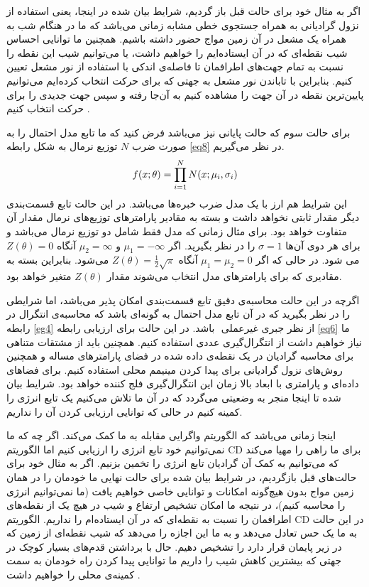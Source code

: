 اگر به مثال خود برای حالت قبل باز گردیم، شرایط بیان شده در اینجا، یعنی‌ استفاده از نزول گرادیانی به همراه جستجوی خطی‌ مشابه زمانی‌ می‌‌باشد که ما در هنگام شب به همراه یک مشعل در آن زمین مواج حضور داشته باشیم. همچنین ما توانایی احساس شیب نقطه‌ای که در آن ایستاده‌ایم را خواهیم داشت، یا می‌‌توانیم شیب این نقطه را نسبت به تمام جهت‌های اطرافمان تا فاصله‌ی اندکی‌ با استفاده از نور مشعل تعیین کنیم. بنابراین با تاباندن نور مشعل به جهتی‌ که برای حرکت انتخاب کرده‌ایم می‌‌توانیم پایین‌ترین نقطه در آن جهت را مشاهده کنیم به آن‌جا رفته و سپس جهت جدیدی را برای حرکت انتخاب کنیم
 \cite{woodfordnotes}.

 
 
 برای حالت سوم که حالت پایانی نیز می‌‌باشد فرض کنید که ما تابع مدل احتمال را به صورت ضرب
 $N$
 توزیع نرمال به شکل رابطه
\ref{eq8}
 در نظر می‌‌گیریم.
 \begin{align}
 \centering
 	f(x;\theta)=\prod_{i=1}^N N(x;\mu_i,\sigma_i)
 \label{eq8}
 \end{align}
این شرایط هم ارز با یک مدل ضرب خبره‌ها می‌‌باشد. در این حالت تابع قسمت‌بندی دیگر مقدار ثابتی نخواهد داشت و بسته به مقادیر پارامتر‌های توزیع‌های نرمال مقدار آن متفاوت خواهد بود. برای مثال زمانی‌ که مدل فقط شامل دو توزیع نرمال می‌‌باشد و برای هر دوی آن‌ها
 $\sigma = 1$
 را در نظر بگیرید. اگر
 $\mu_1 = -\infty$
 و
 $\mu_2 = \infty$
 آنگاه
 $Z(\theta) = 0$
 می‌ شود. در حالی‌ که اگر
 $\mu_1 = \mu_2 = 0$
 آنگاه
 $Z(\theta) = \frac{1}{2}\sqrt{\pi}$
 می‌شود. بنابراین بسته به مقادیری که برای پارامتر‌های مدل انتخاب می‌‌شوند مقدار
 $Z(\theta)$
 متغیر خواهد بود.
 
 اگرچه در این حالت محاسبه‌‌ی دقیق تابع قسمت‌بندی امکان پذیر می‌‌باشد، اما شرایطی را در نظر بگیرید که در آن تابع مدل احتمال به گونه‌ای باشد که محاسبه‌ی‌ انتگرال در رابطه
\ref{eg4}
 از نظر جبری غیرعملی
 ‌ باشد. در این حالت برای ارزیابی رابطه
\ref{eq6}
 ما نیاز خواهیم داشت از انتگرال‌گیری عددی
 استفاده کنیم. همچنین باید از مشتقات متناهی برای محاسبه گرادیان در یک نقطه‌ی داده شده در فضای پارامتر‌های مساله و همچنین روش‌های نزول گرادیانی برای پیدا کردن مینیمم محلی استفاده کنیم. برای فضاهای داده‌ای و پارامتری با ابعاد بالا زمان این انتگرال‌گیری فلج کننده
 خواهد بود. شرایط بیان شده تا اینجا منجر به وضعیتی می‌‌گردد که در آن ما تلاش می‌‌کنیم یک تابع انرژی را کمینه کنیم در حالی‌ که توانایی ارزیابی کردن آن را نداریم.
 
 اینجا زمانی‌ می‌‌باشد که الگوریتم واگرایی مقابله به ما کمک می‌‌کند. اگر چه که ما نمی‌‌توانیم خود تابع انرژی را ارزیابی کنیم اما الگوریتم
 CD
 برای ما راهی‌ را مهیا می‌‌کند که می‌توانیم به کمک آن گرادیان تابع انرژی را تخمین بزنیم. اگر به مثال خود برای حالت‌های قبل بازگردیم، در شرایط بیان شده برای حالت نهایی ما خودمان را در همان زمین مواج بدون هیچ‌گونه امکانات و توانایی خاصی خواهیم یافت (ما نمی‌‌توانیم انرژی را محاسبه کنیم)، در نتیجه ما امکان تشخیص ارتفاع و شیب در هیچ یک از نقطه‌های اطرافمان را نسبت به نقطه‌ای که در آن ایستاده‌ام را نداریم. الگوریتم
 CD
 در این حالت به ما یک حس تعادل می‌‌دهد و به ما این اجازه را می‌‌دهد که شیب نقطه‌ای از زمین که در زیر پایمان قرار دارد را تشخیص دهیم. حال با برداشتن قدم‌های بسیار کوچک در جهتی‌ که بیشترین کاهش شیب را داریم ما توانایی پیدا کردن راه خودمان به سمت کمینه‌ی محلی را خواهیم داشت
 \cite{woodfordnotes}.
 
